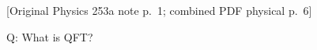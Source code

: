 %
%

\providecommand{\YinPageBoundary}[2]{%
  \clearpage
  \noindent\textsf{[Original Physics 253a note p.~#1; combined PDF physical p.~#2]}%
  \par\medskip
}
\providecommand{\YinLine}[1]{\noindent #1\par}
\providecommand{\YinIndent}[1]{\noindent\hspace*{2em}#1\par}
\providecommand{\YinBullet}[1]{\noindent\hspace*{1em}$\bullet$\hspace{0.7em}#1\par}
\providecommand{\YinDash}[1]{\noindent\hspace*{1em}--\hspace{0.7em}#1\par}
\providecommand{\YinBlue}[1]{{\color[rgb]{0.00,0.34,0.92}#1}}
\providecommand{\YinLightBlue}[1]{{\color[rgb]{0.47,0.67,0.82}#1}}
\providecommand{\YinPurple}[1]{{\color[rgb]{0.61,0.16,0.88}#1}}
\providecommand{\YinGray}[1]{{\color[rgb]{0.58,0.58,0.58}#1}}
\providecommand{\YinGreen}[1]{{\color[rgb]{0.00,0.52,0.22}#1}}
\providecommand{\YinRed}[1]{{\color[rgb]{0.95,0.18,0.10}#1}}
\providecommand{\ket}[1]{\lvert #1\rangle}
\providecommand{\bra}[1]{\langle #1\rvert}
\providecommand{\braket}[2]{\langle #1\mid #2\rangle}

\YinPageBoundary{1}{6}

\YinLine{Q: What is QFT?}

